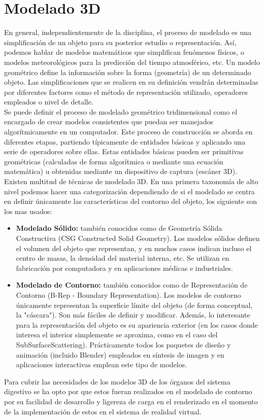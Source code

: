 \section{Modelado 3D}
En general, independientemente de la disciplina, el proceso de modelado es una simplificación de un objeto para su posterior estudio o representación. 
Así, podemos hablar de modelos matemáticos que simplifican fenómenos físicos, o modelos meteorológicos para la predicción del tiempo atmosférico, etc.
 Un modelo geométrico define la información sobre la forma (geometría) de un determinado objeto. Las simplificaciones que se realicen en su definición 
 vendrán determinadas por diferentes factores como el método de representación utilizado, operadores empleados o nivel de detalle.\cite{web13} \\
Se puede definir el proceso de modelado geométrico tridimensional como el encargado de crear modelos consistentes que puedan ser manejados algorítmicamente 
en un computador. Este proceso de construcción se aborda en diferentes etapas, partiendo típicamente de entidades básicas y aplicando una serie de operadores 
sobre ellas. Estas entidades básicas pueden ser primitivas geométricas (calculadas de forma algorítmica o mediante una ecuación matemática) u obtenidas mediante 
un dispositivo de captura (escáner 3D).\\
Existen multitud de técnicas de modelado 3D. En una primera taxonomía de alto nivel podemos hacer una categorización dependiendo de si el modelado se centra 
en definir únicamente las características del contorno del objeto, los siguiente son los mas usados:\\
\begin{itemize}
\item \textbf{Modelado Sólido:} también conocidos como de Geometría Sólida Constructiva (CSG Constructed Solid Geometry). Los modelos sólidos definen el volumen 
del objeto que representan, y en muchos casos indican incluso el centro de masas, la densidad del material interna, etc. Se utilizan en fabricación por computadora 
y en aplicaciones médicas e industriales.
\item \textbf{Modelado de Contorno:} también conocidos como de Representación de Contorno (B-Rep - Boundary Representation). Los modelos de contorno únicamente 
representan la superficie límite del objeto (de forma conceptual, la "cáscara"). Son más fáciles de definir y modificar. Además, lo interesante para la representación 
del objeto es su apariencia exterior (en los casos donde interesa el interior simplemente se aproxima, como en el caso del SubSurfaceScattering). Prácticamente todos 
los paquetes de diseño y animación (incluido Blender) empleados en síntesis de imagen y en aplicaciones interactivas emplean este tipo de modelos.
\end{itemize}
Para  cubrir las necesidades de los modelos 3D de los órganos del sistema digestivo se ha opto por que estos fueran realizados en el modelado de contorno por su facilidad 
de desarrollo y ligereza de carga en el renderizado en el momento de la implementación de estos en el sistema de realidad virtual.\\

